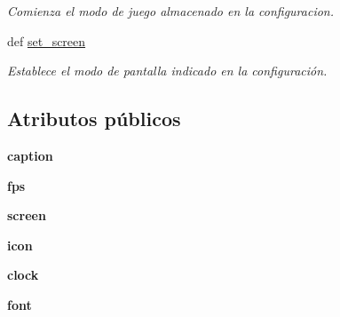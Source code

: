 \begin{DoxyCompactItemize}
\begin{DoxyCompactList}\small\item\em \-Comienza el modo de juego almacenado en la configuracion. \end{DoxyCompactList}\item 
\hypertarget{classengine_1_1game_1_1Game_a64f6e33e2be45b171ea091b100d4e02f}{
def \hyperlink{classengine_1_1game_1_1Game_a64f6e33e2be45b171ea091b100d4e02f}{set\-\_\-screen}}
\label{classengine_1_1game_1_1Game_a64f6e33e2be45b171ea091b100d4e02f}

\begin{DoxyCompactList}\small\item\em \-Establece el modo de pantalla indicado en la configuración. \end{DoxyCompactList}\end{DoxyCompactItemize}
\subsection*{\-Atributos públicos}
\begin{DoxyCompactItemize}
\item 
\hypertarget{classengine_1_1game_1_1Game_a6db666c568430a84c9ec269bf29ccf52}{
{\bfseries caption}}
\label{classengine_1_1game_1_1Game_a6db666c568430a84c9ec269bf29ccf52}

\item 
\hypertarget{classengine_1_1game_1_1Game_acd388dc39c795c4e5cf0043a4d735ef9}{
{\bfseries fps}}
\label{classengine_1_1game_1_1Game_acd388dc39c795c4e5cf0043a4d735ef9}

\item 
\hypertarget{classengine_1_1game_1_1Game_a3c5b57c23b58bedaff8c388f9a400637}{
{\bfseries screen}}
\label{classengine_1_1game_1_1Game_a3c5b57c23b58bedaff8c388f9a400637}

\item 
\hypertarget{classengine_1_1game_1_1Game_a7cf1e7d0f4c2b584790bc5817828f044}{
{\bfseries icon}}
\label{classengine_1_1game_1_1Game_a7cf1e7d0f4c2b584790bc5817828f044}

\item 
\hypertarget{classengine_1_1game_1_1Game_ab5f0f81d535aafddbcf6697f1dd8255b}{
{\bfseries clock}}
\label{classengine_1_1game_1_1Game_ab5f0f81d535aafddbcf6697f1dd8255b}

\item 
\hypertarget{classengine_1_1game_1_1Game_a5129b3d7e113178ba2e7c426af3fd3e9}{
{\bfseries font}}
\label{classengine_1_1game_1_1Game_a5129b3d7e113178ba2e7c426af3fd3e9}

\end{DoxyCompactItemize}


